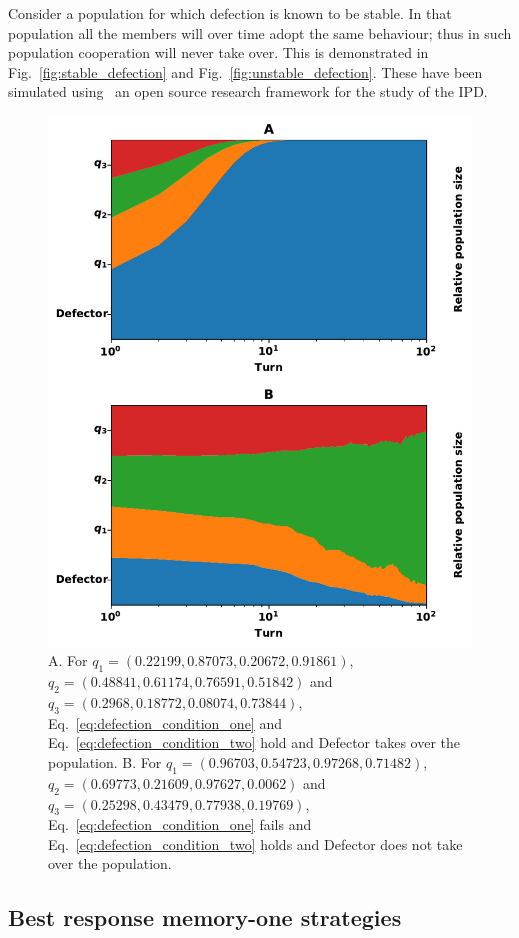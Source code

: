\documentclass[9pt,twocolumn,twoside,lineno]{pnas-new}
\begin{document}
Consider a population for which defection is known to be stable. In that
population all the members will over time adopt the same behaviour; thus in such
population cooperation will never take over. This is demonstrated in
Fig.~\ref{fig:stable_defection} and Fig.~\ref{fig:unstable_defection}.
These have been simulated using~\cite{axelrodproject} an open
source research framework for the study of the IPD.

\begin{figure}
    \centering
    \includegraphics[width=.75\linewidth]{stability_of_defection_plots.pdf}
    \caption{A. For \(q_{1}=(0.22199, 0.87073, 0.20672, 0.91861)\),
    $q_{2}=(0.48841, 0.61174, 0.76591, 0.51842)$ and
    $q_{3}=(0.2968, 0.18772, 0.08074, 0.73844)$, Eq.~\ref{eq:defection_condition_one} and
    Eq.~\ref{eq:defection_condition_two} hold and Defector takes over the
    population. B. For $q_{1}=(0.96703, 0.54723, 0.97268, 0.71482)$,
    $q_{2}=(0.69773, 0.21609, 0.97627, 0.0062)$ and
    $q_{3}=(0.25298, 0.43479, 0.77938, 0.19769)$, Eq.~\ref{eq:defection_condition_one} fails and
    Eq.~\ref{eq:defection_condition_two} holds and Defector does not take over
    the population.}
\end{figure}

\subsection*{Best response memory-one strategies}
\end{document}
